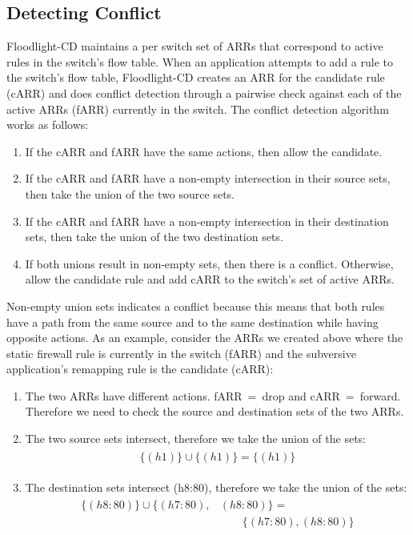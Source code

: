 \subsection{Detecting Conflict}
\label{subsec:conflict}
Floodlight-CD maintains a per switch set of ARRs that correspond to active rules in the switch's flow table.
When an application attempts to add a rule to the switch's flow table, Floodlight-CD creates an ARR for the candidate rule (cARR) and does conflict detection through a pairwise check against each of the active ARRs (fARR) currently in the switch. 
The conflict detection algorithm works as follows:
\begin{enumerate}
\item If the cARR and fARR have the same actions, then allow the candidate.
\item If the cARR and fARR have a non-empty intersection in their source sets, then take the union of the two source sets.
\item If the cARR and fARR have a non-empty intersection in their destination sets, then take the union of the two destination sets.
\item If both unions result in non-empty sets, then there is a conflict. Otherwise, allow the candidate rule and add cARR to the switch's set of active ARRs.
\end{enumerate} 

Non-empty union sets indicates a conflict because this means that both rules have a path from the same source and to the same destination while having opposite actions.
As an example, consider the ARRs we created above where the static firewall rule is currently in the switch (fARR) and the subversive application's remapping rule is the candidate (cARR):

\begin{enumerate}
\item The two ARRs have different actions. \mbox{fARR = drop} and \mbox{cARR = forward}. Therefore we need to check the source and destination sets of the two ARRs.
\item The two source sets intersect, therefore we take the union of the sets:
\begin{align}
\begin{aligned}
\{(h1)\} \cup \{(h1)\} = \{(h1)\} \nonumber
\end{aligned}
\end{align}
\item The destination sets intersect (h8:80), therefore we take the union of the sets:
\begin{align}
\begin{aligned}
\{(h8:80)\} \cup \{(h7:80),&(h8:80)\} = \\
        & \qquad \{(h7:80),(h8:80)\} \nonumber
\end{aligned}
\end{align}
\end{enumerate} 

